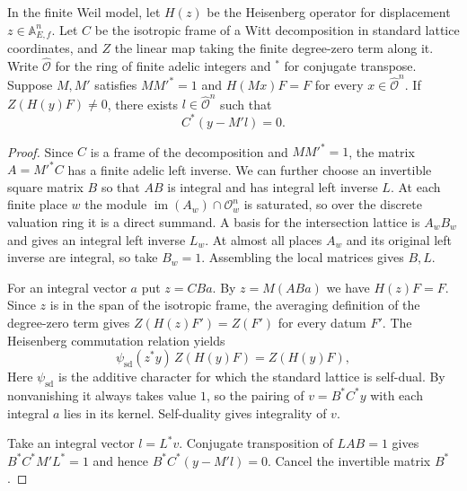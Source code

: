 \begin{lemma}
\label{lem:a-finite-zero-term-support}
\emitthmsource
In the finite Weil model, let $H(z)$ be the Heisenberg operator for displacement $z\in\mathbb A_{E,f}^{n}$. Let $C$ be the isotropic frame of a Witt decomposition in standard lattice coordinates, and $Z$ the linear map taking the finite degree-zero term along it. Write $\widehat{\mathcal O}$ for the ring of finite adelic integers and $^\ast$ for conjugate transpose. Suppose $M,M'$ satisfies $MM'^\ast=1$ and $H(Mx)F=F$ for every $x\in\widehat{\mathcal O}^{n}$. If $Z(H(y)F)\ne0$, there exists $l\in\widehat{\mathcal O}^{n}$ such that
\[
 C^\ast(y-M'l)=0.
\]
\end{lemma}
\begin{proof}
Since $C$ is a frame of the decomposition and $MM'^\ast=1$, the matrix $A=M'^\ast C$ has a finite adelic left inverse. We can further choose an invertible square matrix $B$ so that $AB$ is integral and has integral left inverse $L$. At each finite place $w$ the module $\operatorname{im}(A_w)\cap\mathcal O_w^n$ is saturated, so over the discrete valuation ring it is a direct summand. A basis for the intersection lattice is $A_wB_w$ and gives an integral left inverse $L_w$. At almost all places $A_w$ and its original left inverse are integral, so take $B_w=1$. Assembling the local matrices gives $B,L$.

For an integral vector $a$ put $z=CBa$. By $z=M(ABa)$ we have $H(z)F=F$. Since $z$ is in the span of the isotropic frame, the averaging definition of the degree-zero term gives $Z(H(z)F')=Z(F')$ for every datum $F'$. The Heisenberg commutation relation yields
\[
 \psi_{\mathrm{sd}}(z^\ast y)\,Z(H(y)F)=Z(H(y)F),
\]
Here $\psi_{\mathrm{sd}}$ is the additive character for which the standard lattice is self-dual. By nonvanishing it always takes value $1$, so the pairing of $v=B^\ast C^\ast y$ with each integral $a$ lies in its kernel. Self-duality gives integrality of $v$.

Take an integral vector $l=L^\ast v$. Conjugate transposition of $LAB=1$ gives $B^\ast C^\ast M' L^\ast=1$ and hence $B^\ast C^\ast(y-M'l)=0$. Cancel the invertible matrix $B^\ast$.
\end{proof}

